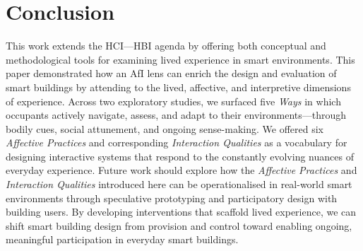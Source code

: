 \section{Conclusion}
\label{sec:ch3-conclusion}
This work extends the HCI---HBI agenda by offering both conceptual and methodological tools for examining lived experience in smart environments. This paper demonstrated how an AfI lens can enrich the design and evaluation of smart buildings by attending to the lived, affective, and interpretive dimensions of experience. Across two exploratory studies, we surfaced five \emph{Ways} in which occupants actively navigate, assess, and adapt to their environments---through bodily cues, social attunement, and ongoing sense-making. We offered six \textit{Affective Practices} and corresponding \textit{Interaction Qualities} as a vocabulary for designing interactive systems that respond to the constantly evolving nuances of everyday experience. Future work should explore how the \textit{Affective Practices} and \textit{Interaction Qualities} introduced here can be operationalised in real-world smart environments through speculative prototyping and participatory design with building users. By developing interventions that scaffold lived experience, we can shift smart building design from provision and control toward enabling ongoing, meaningful participation in everyday smart buildings.
